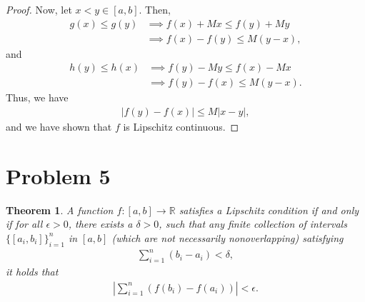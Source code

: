 \documentclass[10pt,a4paper]{article}
\theoremstyle{theorem}
\newtheorem{theorem}{Theorem}
\theoremstyle{definition}
\begin{document}
\begin{proof}
Now, let $x < y \in [a, b]$. Then,
\begin{align*}
g(x) \leq g(y) &\implies f(x) + Mx \leq f(y) + My\\
&\implies f(x) - f(y) \leq M(y - x),
\end{align*}
and
\begin{align*}
h(y) \leq h(x) &\implies f(y) - My \leq f(x) - Mx\\
&\implies f(y) - f(x) \leq M(y - x).
\end{align*}
Thus, we have
\begin{align*}
|f(y) - f(x)| \leq M|x - y|,
\end{align*}
and we have shown that $f$ is Lipschitz continuous.
\end{proof}

\section*{Problem 5} 
\begin{theorem}
A function $f:[a, b] \to \mathbb{R}$ satisfies a Lipschitz condition if and only if for all $\epsilon > 0$, there exists a $\delta > 0$, such that any finite collection of intervals $\{[a_i, b_i] \}_{i=1}^n$ in $[a, b]$ (which are not necessarily nonoverlapping) satisfying 
\begin{align*}
\sum_{i=1}^n (b_i - a_i) < \delta,
\end{align*}
it holds that 
\begin{align*}
\left|\sum_{i=1}^n (f(b_i) - f(a_i))\right| < \epsilon.
\end{align*}
\end{theorem}
\end{document}
